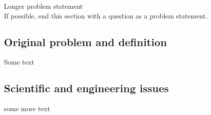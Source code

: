 Longer problem statement\\
If possible, end this section with a question as a problem statement.

\subsection{Original problem and definition}
\label{sec:researchQuestion}
Some text

\subsection{Scientific and engineering issues}
some more text